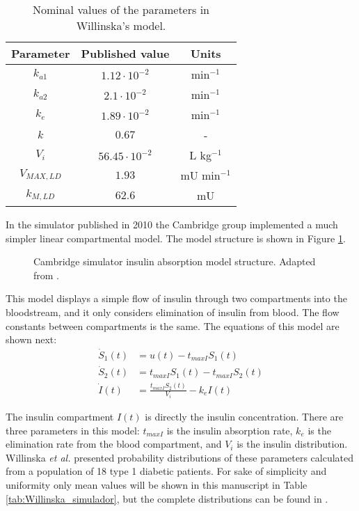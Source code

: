 \begin{table}[hbtp]
	\centering
		\begin{tabular}{|c c c|}
		\hline 
		Parameter &	Published value & Units \\
		\hline
		$k_{a1}$ & $1.12\cdot 10^{-2}$ & min$^{-1}$ \\
		$k_{a2}$ & $2.1\cdot 10^{-2}$ & min$^{-1}$ \\
		$k_{e}$ & $1.89\cdot 10^{-2}$ & min$^{-1}$ \\
		$k$ & $0.67$ & - \\
		$V_i$ & $56.45\cdot 10^{-2}$ & L kg$^{-1}$ \\
		$V_{MAX,LD}$ & $1.93$ & mU min$^{-1}$ \\
		$k_{M,LD}$ & $62.6$ & mU \\
		\hline		
		\end{tabular}
	\caption{Nominal values of the parameters in Willinska's model.}
	\label{tab:Willinska}
\end{table}

In the simulator published in 2010 \cite{simuladorhovorka} the Cambridge group implemented a much simpler linear compartmental model. The model structure is shown in Figure \ref{fig:willinska_simulator}.

\begin{figure}[hbtp]
\centering
{}\caption{Cambridge simulator insulin absorption model structure. Adapted from \cite{simuladorhovorka}.}
\label{fig:willinska_simulator}
\end{figure}

This model displays a simple flow of insulin through two compartments into the bloodstream, and it only considers elimination of insulin from blood. The flow constants between compartments is the same. The equations of this model are shown next:
\begin{align}
	\dot{S}_{1}(t) &= u(t)-t_{maxI}S_{1}(t) \label{eq:Willinska_simulator1}\\
	\dot{S}_{2}(t) &= t_{maxI}S_{1}(t)-t_{maxI}S_{2}(t) \label{eq:Willinska_simulator2}\\
	\dot{I}(t) &= \frac{t_{maxI}S_{2}(t)}{V_{i}}-k_{e}I(t)\label{eq:Willinska_simulator3}
\end{align}

The insulin compartment $I(t)$ is directly the insulin concentration. There are three parameters in this model: $t_{maxI}$ is the insulin absorption rate, $k_{e}$ is the elimination rate from the blood compartment, and $V_{i}$ is the insulin distribution. Willinska \textit{et al.} presented probability distributions of these parameters calculated from a population of 18 type 1 diabetic patients. For sake of simplicity and uniformity only mean values will be shown in this manuscript in Table \ref{tab:Willinska_simulador}, but the complete distributions can be found in \cite{simuladorhovorka}.

